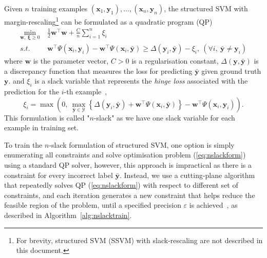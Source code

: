 Given $n$ training examples $(\mathbf{x}_1, \mathbf{y}_1), \dots, (\mathbf{x}_n, \mathbf{y}_n)$, 
the structured SVM with margin-rescaling\footnote{For brevity, structured SVM (SSVM) with slack-rescaling are not described in this document.}
can be formulated as a quadratic program (QP)
\begin{equation}
\label{eq:nslackform}
\begin{aligned}
\min_{\mathbf{w}, ~\bm{\xi} \ge 0} ~& \frac{1}{2} \mathbf{w}^\top \mathbf{w} + \frac{C}{n} \sum_{i=1}^n \xi_i \\
s.t.~~ ~& \mathbf{w}^\top \Psi(\mathbf{x}_i, \mathbf{y}_i) - \mathbf{w}^\top \Psi(\mathbf{x}_i, \bar{\mathbf{y}}) \ge 
       \Delta(\mathbf{y}_i, \bar{\mathbf{y}}) - \xi_i, ~(\forall i,~ \bar{\mathbf{y}} \neq \mathbf{y}_i)
\end{aligned}
\end{equation}
where $\mathbf{w}$ is the parameter vector, $C > 0$ is a regularisation constant,
$\Delta(\mathbf{y}, \bar{\mathbf{y}})$ is a discrepancy function that measures the loss 
for predicting $\bar{\mathbf{y}}$ given ground truth $\mathbf{y}$.
and $\xi_i$ is a slack variable that represents the \emph{hinge loss} associated with 
the prediction for the $i$-th example~\cite{tsochantaridis2005large},
\begin{equation}
\label{eq:nslackloss}
\xi_i = \max \left( 0,~ 
        \max_{\bar{\mathbf{y}} \in \mathcal{Y}} 
        \left\{ \Delta(\mathbf{y}_i, \bar{\mathbf{y}}) + \mathbf{w}^\top \Psi(\mathbf{x}_i, \bar{\mathbf{y}}) \right\} -
        \mathbf{w}^\top \Psi(\mathbf{x}_i, \mathbf{y}_i) \right).
\end{equation}
This formulation is called "$n$-slack" as we have one slack variable for each example in training set. 

To train the $n$-slack formulation of structured SVM, one option is simply enumerating all constraints and 
solve optimisation problem (\ref{eq:nslackform}) using a standard QP solver, 
however, this approach is impractical as there is a constraint for every incorrect label $\bar{\mathbf{y}}$.
Instead, we use a cutting-plane algorithm that repeatedly solves QP (\ref{eq:nslackform}) with respect to different set of constraints, 
and each iteration generates a new constraint that helps reduce the feasible region of the problem, 
until a specified precision $\varepsilon$ is achieved~\cite{joachims2009predicting}, as described in Algorithm~\ref{alg:nslacktrain}.

